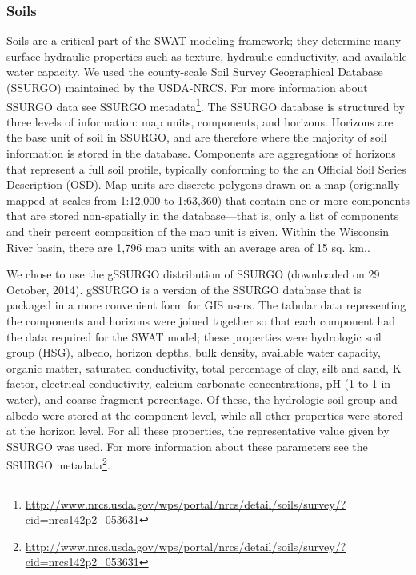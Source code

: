 \subsubsection{Soils}
Soils are a critical part of the SWAT modeling framework; they determine many
surface hydraulic properties such as texture, hydraulic conductivity, and
available water capacity. We used the county-scale Soil Survey Geographical
Database (SSURGO) maintained by the USDA-NRCS. For more information about SSURGO
data see SSURGO
metadata\footnote{\url{http://www.nrcs.usda.gov/wps/portal/nrcs/detail/soils/survey/?cid=nrcs142p2_053631}}.
The SSURGO database is structured by three levels of information: map units,
components, and horizons. Horizons are the base unit of soil in SSURGO, and are
therefore where the majority of soil information is stored in the database.
Components are aggregations of horizons that represent a full soil profile,
typically conforming to the an Official Soil Series Description (OSD). Map units
are discrete polygons drawn on a map (originally mapped at scales from 1:12,000
to 1:63,360) that contain one or more components that are stored non-spatially
in the database---that is, only a list of components and their percent
composition of the map unit is given. Within the Wisconsin River basin, there
are 1,796 map units with an average area of 15 sq. km..

We chose to use the gSSURGO distribution of SSURGO (downloaded on 29 October,
2014). gSSURGO is a version of the SSURGO database that is packaged in a more
convenient form for GIS users. The tabular data representing the components and
horizons were joined together so that each component had the data required for
the SWAT model; these properties were hydrologic soil group (HSG), albedo,
horizon depths, bulk density, available water capacity, organic matter,
saturated conductivity, total percentage of clay, silt and sand, K factor,
electrical conductivity, calcium carbonate concentrations, pH (1 to 1 in water),
and coarse fragment percentage. Of these, the hydrologic soil group and albedo
were stored at the component level, while all other properties were stored at
the horizon level. For all these properties, the representative value given by
SSURGO was used. For more information about these parameters see the SSURGO
metadata\footnote{\url{http://www.nrcs.usda.gov/wps/portal/nrcs/detail/soils/survey/?cid=nrcs142p2_053631}}.

